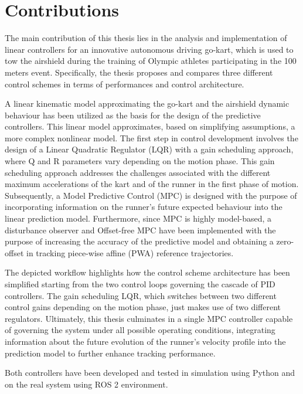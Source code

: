 \documentclass[a4paper,12pt,oneside]{book}
\begin{document}
	
\section*{Contributions}
The main contribution of this thesis lies in the analysis and implementation of linear controllers for an innovative autonomous driving go-kart, which is used to tow the airshield during the training of Olympic athletes participating in the 100 meters event.
Specifically, the thesis proposes and compares three different control schemes in terms of performances and control architecture.

\bigskip
A linear kinematic model approximating the go-kart and the airshield dynamic behaviour has been utilized as the basis for the design of the predictive controllers.
This linear model approximates, based on simplifying assumptions, a more complex nonlinear model.
The first step in control development involves the design of a Linear Quadratic Regulator (LQR) with a gain scheduling approach, where Q and R parameters vary depending on the motion phase. 
This gain scheduling approach addresses the challenges associated with the different maximum accelerations of the kart and of the runner in the first phase of motion.
Subsequently, a Model Predictive Control (MPC) is designed with the purpose of incorporating information on the runner's future expected behaviour into the linear prediction model.
Furthermore, since MPC is highly model-based, a disturbance observer and Offset-free MPC have been implemented with the purpose of increasing the accuracy of the predictive model and obtaining a zero-offset in tracking piece-wise affine (PWA) reference trajectories.

\bigskip
The depicted workflow highlights how the control scheme architecture has been simplified starting from the two control loops governing the cascade of PID controllers. 
The gain scheduling LQR, which switches between two different control gains depending on the motion phase, just makes use of two different regulators. 
Ultimately, this thesis culminates in a single MPC controller capable of governing the system under all possible operating conditions, integrating information about the future evolution of the runner's velocity profile into the prediction model to further enhance tracking performance.

\bigskip
Both controllers have been developed and tested in simulation using Python and on the real system using ROS 2 environment.
\end{document}
